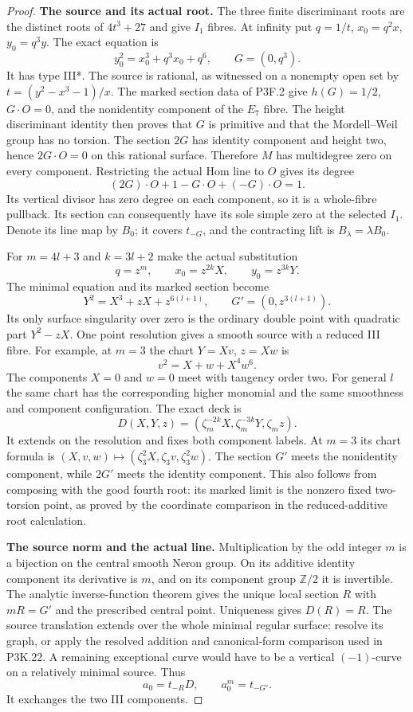 \begin{proof}
\par\medskip\noindent\textbf{The source and its actual root.}
The three finite discriminant roots are the distinct roots of
$4t^3+27$ and give $I_1$ fibres. At infinity put
$q=1/t$, $x_0=q^2x$, $y_0=q^3y$. The exact equation is
\[
 y_0^2=x_0^3+q^3x_0+q^6,\qquad G=(0,q^3).
\]
It has type III*. The source is rational, as witnessed on a
nonempty open set by $t=(y^2-x^3-1)/x$. The marked section data
of P3F.2 give $h(G)=1/2$, $G\cdot O=0$, and the nonidentity
component of the $E_7$ fibre. The height discriminant identity
then proves that $G$ is primitive and that the Mordell--Weil group
has no torsion. The section $2G$ has identity component and height
two, hence $2G\cdot O=0$ on this rational surface. Therefore
$M$ has multidegree zero on every component. Restricting the
actual Hom line to $O$ gives its degree
\[
 (2G)\cdot O+1-G\cdot O+(-G)\cdot O=1.
\]
Its vertical divisor has zero degree on each component, so it is
a whole-fibre pullback. Its section can consequently have its
sole simple zero at the selected $I_1$. Denote its line map by
$B_0$; it covers $t_{-G}$, and the contracting lift is
$B_\lambda=\lambda B_0$.

For $m=4l+3$ and $k=3l+2$ make the actual substitution
\[
 q=z^m,\qquad x_0=z^{2k}X,\qquad y_0=z^{3k}Y.
\]
The minimal equation and its marked section become
\[
 Y^2=X^3+zX+z^{6(l+1)},\qquad G'=(0,z^{3(l+1)}).       \tag{F37.1}
\]
Its only surface singularity over zero is the ordinary double
point with quadratic part $Y^2-zX$. One point resolution gives
a smooth source with a reduced III fibre. For example, at $m=3$
the chart $Y=Xv$, $z=Xw$ is
\[
 v^2=X+w+X^4w^6.
\]
The components $X=0$ and $w=0$ meet with tangency order two.
For general $l$ the same chart has the corresponding higher
monomial and the same smoothness and component configuration.
The exact deck is
\[
 D(X,Y,z)=(\zeta_m^{-2k}X,\zeta_m^{-3k}Y,\zeta_m z).   \tag{F37.2}
\]
It extends on the resolution and fixes both component labels.
At $m=3$ its chart formula is
$(X,v,w)\mapsto(\zeta_3^2X,\zeta_3v,\zeta_3^2w)$.
The section $G'$ meets the nonidentity component, while $2G'$
meets the identity component. This also follows from composing
with the good fourth root: its marked limit is the nonzero fixed
two-torsion point, as proved by the coordinate comparison in the
reduced-additive root calculation.

\par\medskip\noindent\textbf{The source norm and the actual line.}
Multiplication by the odd integer $m$ is a bijection on the
central smooth Neron group. On its additive identity component
its derivative is $m$, and on its component group $\mathbb Z/2$
it is invertible. The analytic inverse-function theorem gives the
unique local section $R$ with $mR=G'$ and the prescribed central
point. Uniqueness gives $D(R)=R$. The source translation extends
over the whole minimal regular surface: resolve its graph, or
apply the resolved addition and canonical-form comparison used
in P3K.22. A remaining exceptional curve would have to be a
vertical $(-1)$-curve on a relatively minimal source. Thus
\[
                   a_0=t_{-R}D,\qquad a_0^m=t_{-G'}.
\]
It exchanges the two III components.


\end{proof}
